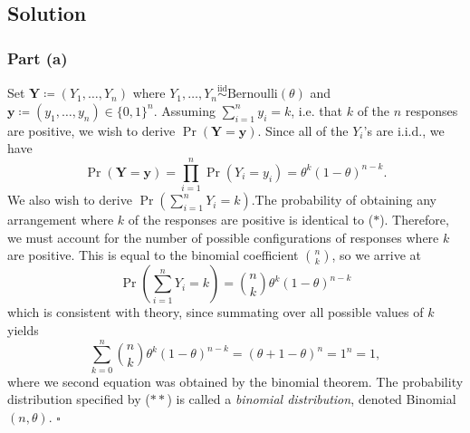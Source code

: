 \documentclass{report}
\begin{document}
\subsection*{Solution}

\subsubsection*{Part (a)}
Set $\mathbf{Y} \coloneqq (Y_1, \ldots, Y_n)$ where $Y_1, \ldots, Y_n \overset{\text{iid}}{\sim} \text{Bernoulli}(\theta)$ and $\mathbf{y} \coloneqq (y_1, \ldots, y_n) \in \{0,1\}^n$. Assuming $\sum_{i = 1}^n y_i = k$, i.e. that $k$ of the $n$ responses are positive, we wish to derive
\(\Pr(\mathbf{Y} = \mathbf{y})\).
Since all of the $Y_i$'s are i.i.d., we have
\[
\Pr(\mathbf{Y} = \mathbf{y}) = \prod_{i = 1}^n \Pr(Y_i = y_i) = \theta^k (1 - \theta)^{n - k}. \tag{$\ast$}
\]
We also wish to derive $\Pr\left(\sum_{i = 1}^n Y_i = k\right)$.\@ The probability of obtaining any arrangement where $k$ of the responses are positive is identical to ($\ast$). Therefore, we must account for the number of possible configurations of responses where $k$ are positive. This is equal to the binomial coefficient $\binom{n}{k}$, so we arrive at
\[
\Pr\left(\sum_{i = 1}^n Y_i = k\right) = \binom{n}{k} \theta^k (1 - \theta)^{n - k} \tag{\(\ast\ast\)}
\]
which is consistent with theory, since summating over all possible values of $k$ yields
\[
\sum_{k = 0}^n \binom{n}{k} \theta^k (1 - \theta)^{n - k} = (\theta + 1 - \theta)^n = 1^n = 1,
\]
where we second equation was obtained by the binomial theorem. The probability distribution specified by (\(\ast\ast\)) is called a \emph{binomial distribution}, denoted Binomial$(n, \theta)$. \hfill\(\square\)
 
\end{document}
